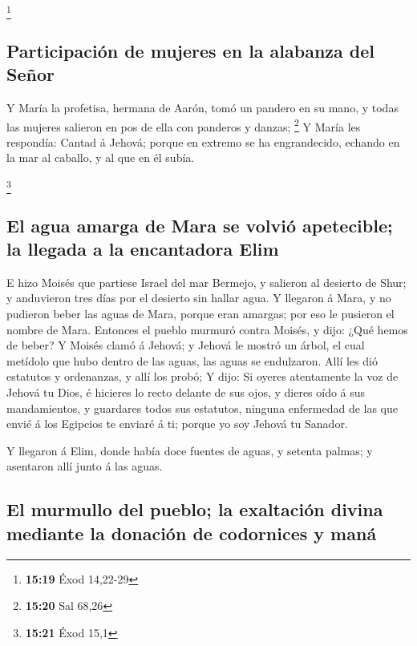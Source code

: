 \footnote{\textbf{15:19} Éxod 14,22-29}

\hypertarget{participaciuxf3n-de-mujeres-en-la-alabanza-del-seuxf1or}{%
\subsection{Participación de mujeres en la alabanza del
Señor}\label{participaciuxf3n-de-mujeres-en-la-alabanza-del-seuxf1or}}

 Y María la profetisa, hermana de Aarón, tomó un pandero en
su mano, y todas las mujeres salieron en pos de ella con panderos y
danzas; \footnote{\textbf{15:20} Sal 68,26}  Y María les
respondía: Cantad á Jehová; porque en extremo se ha engrandecido,
echando en la mar al caballo, y al que en él subía.

\footnote{\textbf{15:21} Éxod 15,1}

\hypertarget{el-agua-amarga-de-mara-se-volviuxf3-apetecible-la-llegada-a-la-encantadora-elim}{%
\subsection{El agua amarga de Mara se volvió apetecible; la llegada a la
encantadora
Elim}\label{el-agua-amarga-de-mara-se-volviuxf3-apetecible-la-llegada-a-la-encantadora-elim}}

 E hizo Moisés que partiese Israel del mar Bermejo, y
salieron al desierto de Shur; y anduvieron tres días por el desierto sin
hallar agua.  Y llegaron á Mara, y no pudieron beber las
aguas de Mara, porque eran amargas; por eso le pusieron el nombre de
Mara.  Entonces el pueblo murmuró contra Moisés, y dijo:
¿Qué hemos de beber?  Y Moisés clamó á Jehová; y Jehová le
mostró un árbol, el cual metídolo que hubo dentro de las aguas, las
aguas se endulzaron. Allí les dió estatutos y ordenanzas, y allí los
probó;  Y dijo: Si oyeres atentamente la voz de Jehová tu
Dios, é hicieres lo recto delante de sus ojos, y dieres oído á sus
mandamientos, y guardares todos sus estatutos, ninguna enfermedad de las
que envié á los Egipcios te enviaré á ti; porque yo soy Jehová tu
Sanador.

 Y llegaron á Elim, donde había doce fuentes de aguas, y
setenta palmas; y asentaron allí junto á las aguas.

\hypertarget{el-murmullo-del-pueblo-la-exaltaciuxf3n-divina-mediante-la-donaciuxf3n-de-codornices-y-manuxe1}{%
\subsection{El murmullo del pueblo; la exaltación divina mediante la
donación de codornices y
maná}\label{el-murmullo-del-pueblo-la-exaltaciuxf3n-divina-mediante-la-donaciuxf3n-de-codornices-y-manuxe1}}


